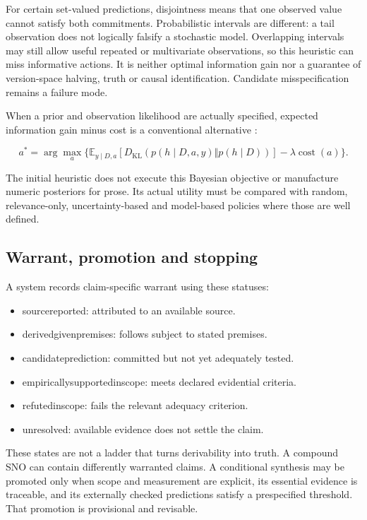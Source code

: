 \documentclass[11pt,a4paper]{article}
\newcommand{\CNSIdentifier}[1]{{\small\ttfamily\def\_{\textunderscore\allowbreak}#1}}
\providecommand{\tightlist}{\setlength{\itemsep}{0pt}\setlength{\parskip}{0pt}}
\begin{document}
For certain set-valued predictions, disjointness means that one observed
value cannot satisfy both commitments. Probabilistic intervals are
different: a tail observation does not logically falsify a stochastic
model. Overlapping intervals may still allow useful repeated or
multivariate observations, so this heuristic can miss informative
actions. It is neither optimal information gain nor a guarantee of
version-space halving, truth or causal identification. Candidate
misspecification remains a failure mode.

When a prior and observation likelihood are actually specified, expected
information gain minus cost is a conventional alternative \citep{R20}:

\[
a^*=\arg\max_a\{\mathbb E_{y\mid D,a}[D_{\mathrm{KL}}(p(h\mid D,a,y)\Vert p(h\mid D))]-\lambda\operatorname{cost}(a)\}.
\]

The initial heuristic does not execute this Bayesian objective or
manufacture numeric posteriors for prose. Its actual utility must be
compared with random, relevance-only, uncertainty-based and model-based
policies where those are well defined.

\subsection{Warrant, promotion and
stopping}\label{warrant-promotion-and-stopping}

A system records claim-specific warrant using these statuses:

\begin{itemize}
\tightlist
\item
  \CNSIdentifier{source\_reported}: attributed to an available source.
\item
  \CNSIdentifier{derived\_given\_premises}: follows subject to stated premises.
\item
  \CNSIdentifier{candidate\_prediction}: committed but not yet adequately
  tested.
\item
  \CNSIdentifier{empirically\_supported\_in\_scope}: meets declared evidential
  criteria.
\item
  \CNSIdentifier{refuted\_in\_scope}: fails the relevant adequacy criterion.
\item
  \CNSIdentifier{unresolved}: available evidence does not settle the claim.
\end{itemize}

These states are not a ladder that turns derivability into truth. A
compound SNO can contain differently warranted claims. A conditional
synthesis may be promoted only when scope and measurement are explicit,
its essential evidence is traceable, and its externally checked
predictions satisfy a prespecified threshold. That promotion is
provisional and revisable.
\end{document}
